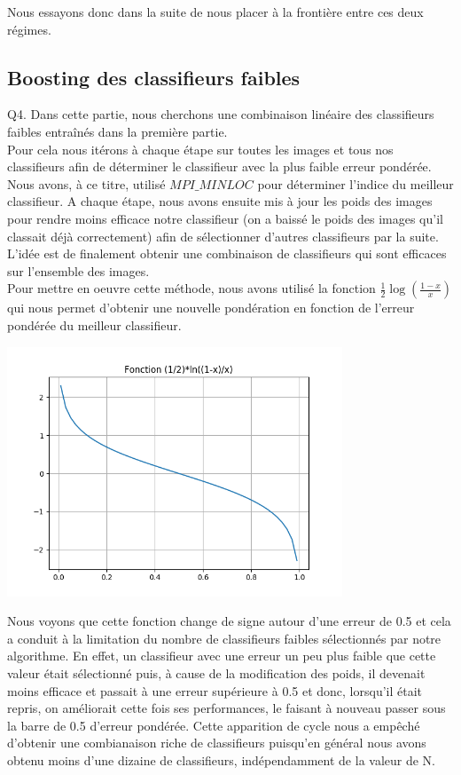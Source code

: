\documentclass[a4paper,11pt]{article}
\begin{document}
Nous essayons donc dans la suite de nous placer à la frontière entre ces deux régimes.\\

\subsection{Boosting des classifieurs faibles}

Q4. Dans cette partie, nous cherchons une combinaison linéaire des classifieurs faibles entraînés dans la première partie.\\
Pour cela nous itérons à chaque étape sur toutes les images et tous nos classifieurs afin de déterminer le classifieur avec la plus faible erreur pondérée. Nous avons, à ce titre, utilisé $MPI\_MINLOC$ pour déterminer l’indice du meilleur classifieur. A chaque étape, nous avons ensuite mis à jour les poids des images pour rendre moins efficace notre classifieur (on a baissé le poids des images qu'il classait déjà correctement) afin de sélectionner d’autres classifieurs par la suite.\\
L’idée est de finalement obtenir une combinaison de classifieurs qui sont efficaces sur l’ensemble des images.\\

Pour mettre en oeuvre cette méthode, nous avons utilisé la fonction $\frac{1}{2}\log(\frac{1-x}{x})$ qui nous permet d'obtenir une nouvelle pondération en fonction de l’erreur pondérée du meilleur classifieur.\\

\begin{center}
\includegraphics[width=10cm]{"Fig5 alpha"}\\
\end{center}

Nous voyons que cette fonction change de signe autour d’une erreur de 0.5 et cela a conduit à la limitation du nombre de classifieurs faibles sélectionnés par notre algorithme. En effet, un classifieur avec une erreur un peu plus faible que cette valeur était sélectionné puis, à cause de la modification des poids, il devenait moins efficace et passait à une erreur supérieure à 0.5 et donc, lorsqu’il était repris, on améliorait cette fois ses performances, le faisant à nouveau passer sous la barre de 0.5 d’erreur pondérée. Cette apparition de cycle nous a empêché d’obtenir une combianaison riche de classifieurs puisqu’en général nous avons obtenu moins d’une dizaine de classifieurs, indépendamment de la valeur de N.\\
\end{document}
